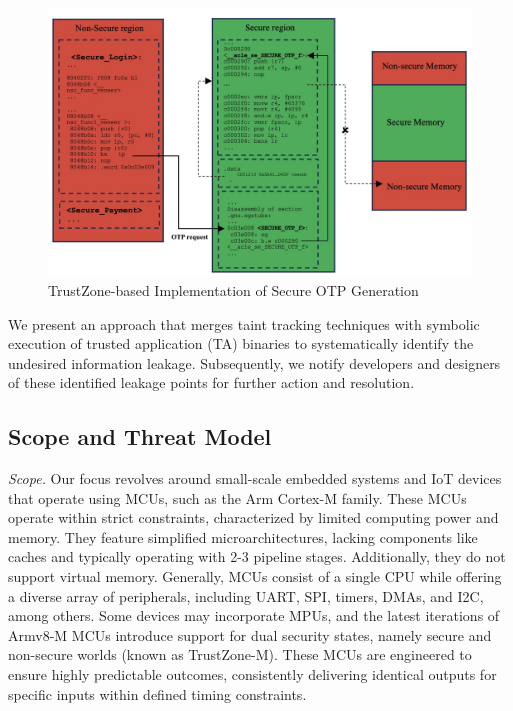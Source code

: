 \begin{figure}
  \centering
  \medskip
  \includegraphics[width=.9\textwidth]{figures/OTP.jpg}
  \caption[Short caption for Table of Figures]{TrustZone-based Implementation of Secure OTP Generation}
  \label{fig:OTP}
\end{figure}

We present an approach that merges taint tracking techniques with symbolic execution of trusted application (\ac{TA}) binaries to systematically identify the undesired information leakage. Subsequently, we notify developers and designers of these identified leakage points for further action and resolution. 

\subsection{Scope and Threat Model}

\textit{Scope.} Our focus revolves around small-scale embedded systems and IoT devices that operate using MCUs, such as the Arm Cortex-M family. These MCUs operate within strict constraints, characterized by limited computing power and memory. They feature simplified microarchitectures, lacking components like caches and typically operating with 2-3 pipeline stages. Additionally, they do not support virtual memory. Generally, MCUs consist of a single CPU while offering a diverse array of peripherals, including UART, SPI, timers, DMAs, and I2C, among others. Some devices may incorporate MPUs, and the latest iterations of Armv8-M MCUs introduce support for dual security states, namely secure and non-secure worlds (known as TrustZone-M). These MCUs are engineered to ensure highly predictable outcomes, consistently delivering identical outputs for specific inputs within defined timing constraints.

